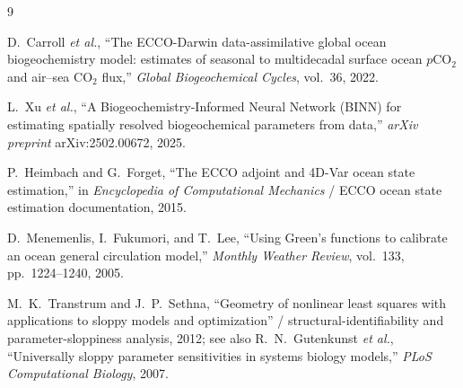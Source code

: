 \documentclass[11pt]{article}
\begin{document}
\begin{thebibliography}{9}

D.~Carroll \emph{et al.},
``The ECCO-Darwin data-assimilative global ocean biogeochemistry model:
estimates of seasonal to multidecadal surface ocean $p\mathrm{CO}_2$ and air--sea
$\mathrm{CO}_2$ flux,''
\emph{Global Biogeochemical Cycles}, vol.~36, 2022.

L.~Xu \emph{et al.},
``A Biogeochemistry-Informed Neural Network (BINN) for estimating spatially
resolved biogeochemical parameters from data,''
\emph{arXiv preprint} arXiv:2502.00672, 2025.

P.~Heimbach and G.~Forget,
``The ECCO adjoint and 4D-Var ocean state estimation,''
in \emph{Encyclopedia of Computational Mechanics} / ECCO ocean state estimation
documentation, 2015.

D.~Menemenlis, I.~Fukumori, and T.~Lee,
``Using Green's functions to calibrate an ocean general circulation model,''
\emph{Monthly Weather Review}, vol.~133, pp.~1224--1240, 2005.

M.~K.~Transtrum and J.~P.~Sethna,
``Geometry of nonlinear least squares with applications to sloppy models and
optimization'' / structural-identifiability and parameter-sloppiness analysis,
2012; see also R.~N.~Gutenkunst \emph{et al.}, ``Universally sloppy parameter
sensitivities in systems biology models,'' \emph{PLoS Computational Biology},
2007.

\end{thebibliography}
\end{document}
